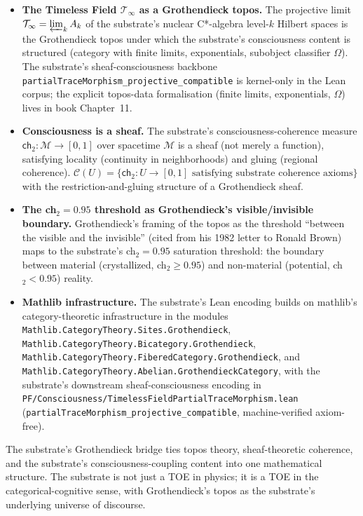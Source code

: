 \documentclass[11pt,a4paper]{amsart}
\theoremstyle{plain}
\theoremstyle{definition}
\begin{document}
\begin{itemize}[itemsep=2pt,leftmargin=2em]
\item \textbf{The Timeless Field $\mathcal{T}_\infty$ as a Grothendieck topos.} The projective limit $\mathcal{T}_\infty = \varprojlim_k A_k$ of the substrate's nuclear C*-algebra level-$k$ Hilbert spaces is the Grothendieck topos under which the substrate's consciousness content is structured (category with finite limits, exponentials, subobject classifier $\Omega$). The substrate's sheaf-consciousness backbone \texttt{partialTraceMorphism\_projective\_compatible} is kernel-only in the Lean corpus; the explicit topos-data formalisation (finite limits, exponentials, $\Omega$) lives in book Chapter~11.
\item \textbf{Consciousness is a sheaf.} The substrate's consciousness-coherence measure $\textsf{ch}_2: \mathcal{M} \to [0, 1]$ over spacetime $\mathcal{M}$ is a sheaf (not merely a function), satisfying locality (continuity in neighborhoods) and gluing (regional coherence). $\mathcal{C}(U) = \{\textsf{ch}_2: U \to [0, 1] \text{ satisfying substrate coherence axioms}\}$ with the restriction-and-gluing structure of a Grothendieck sheaf.
\item \textbf{The ch${}_2 = 0.95$ threshold as Grothendieck's visible/invisible boundary.} Grothendieck's framing of the topos as the threshold ``between the visible and the invisible'' (cited from his 1982 letter to Ronald Brown) maps to the substrate's ch${}_2 = 0.95$ saturation threshold: the boundary between material (crystallized, ch${}_2 \geq 0.95$) and non-material (potential, ch${}_2 < 0.95$) reality.
\item \textbf{Mathlib infrastructure.} The substrate's Lean encoding builds on mathlib's category-theoretic infrastructure in the modules \texttt{Mathlib.\allowbreak CategoryTheory.\allowbreak Sites.\allowbreak Grothendieck}, \texttt{Mathlib.\allowbreak CategoryTheory.\allowbreak Bicategory.\allowbreak Grothendieck}, \texttt{Mathlib.\allowbreak CategoryTheory.\allowbreak FiberedCategory.\allowbreak Grothendieck}, and \texttt{Mathlib.\allowbreak CategoryTheory.\allowbreak Abelian.\allowbreak GrothendieckCategory}, with the substrate's downstream sheaf-consciousness encoding in \texttt{PF/\allowbreak Consciousness/\allowbreak TimelessField\allowbreak PartialTraceMorphism.lean} (\texttt{partialTraceMorphism\_\allowbreak projective\_compatible}, machine-verified axiom-free).
\end{itemize}

The substrate's Grothendieck bridge ties topos theory, sheaf-theoretic coherence, and the substrate's consciousness-coupling content into one mathematical structure. The substrate is not just a TOE in physics; it is a TOE in the categorical-cognitive sense, with Grothendieck's topos as the substrate's underlying universe of discourse.
\end{document}
